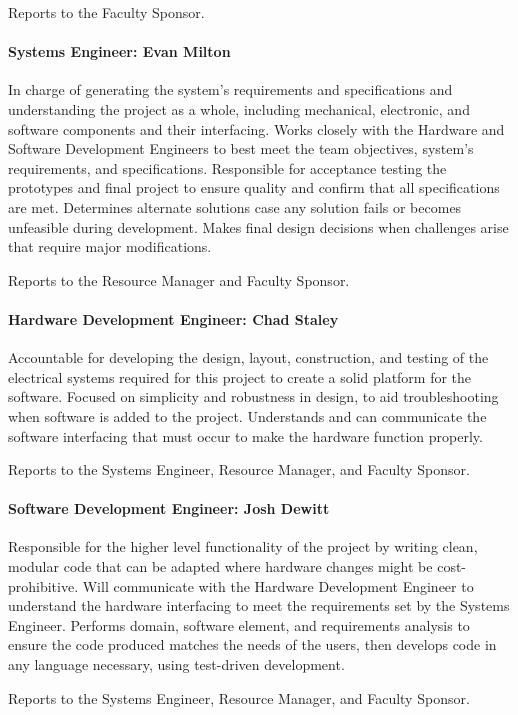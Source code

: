 Reports to the Faculty Sponsor. 

\paragraph{Systems Engineer: Evan Milton}
In charge of generating the system's requirements and specifications and understanding the project as a whole, including mechanical, electronic, and software components and their interfacing.
Works closely with the Hardware and Software Development Engineers to best meet the team objectives, system's requirements, and specifications.
Responsible for acceptance testing the prototypes and final project to ensure quality and confirm that all specifications are met.
Determines alternate solutions case any solution fails or becomes unfeasible during development.
Makes final design decisions when challenges arise that require major modifications.

Reports to the Resource Manager and Faculty Sponsor.

\paragraph{Hardware Development Engineer: Chad Staley}
Accountable for developing the design, layout, construction, and testing of the electrical systems required for this project to create a solid platform for the software.
Focused on simplicity and robustness in design, to aid troubleshooting when software is added to the project.
Understands and can communicate the software interfacing that must occur to make the hardware function properly.

Reports to the Systems Engineer, Resource Manager, and Faculty Sponsor. 

\paragraph{Software Development Engineer: Josh Dewitt}
Responsible for the higher level functionality of the project by writing clean, modular code that can be adapted where hardware changes might be cost-prohibitive.
Will communicate with the Hardware Development Engineer to understand the hardware interfacing to meet the requirements set by the Systems Engineer.
Performs domain, software element, and requirements analysis to ensure the code produced matches the needs of the users, then develops code in any language necessary, using test­-driven development.

Reports to the Systems Engineer, Resource Manager, and Faculty Sponsor.

